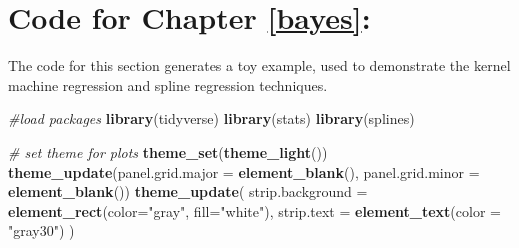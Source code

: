 \documentclass[12pt, twoside]{amherstthesis}
\newenvironment{Shaded}{\begin{snugshade}}{\end{snugshade}}
\newcommand{\AttributeTok}[1]{\textcolor[rgb]{0.13,0.29,0.53}{#1}}
\newcommand{\CommentTok}[1]{\textcolor[rgb]{0.56,0.35,0.01}{\textit{#1}}}
\newcommand{\FunctionTok}[1]{\textcolor[rgb]{0.13,0.29,0.53}{\textbf{#1}}}
\newcommand{\NormalTok}[1]{#1}
\newcommand{\StringTok}[1]{\textcolor[rgb]{0.31,0.60,0.02}{#1}}
\begin{document}
\hypertarget{code-for-chapter-refbayes}{%
\section{Code for Chapter \ref{bayes}:}\label{code-for-chapter-refbayes}}

The code for this section generates a toy example, used to demonstrate the kernel machine regression and spline regression techniques.

\scriptsize
\begin{Shaded}
\begin{Highlighting}[]
\CommentTok{\#load packages}
\FunctionTok{library}\NormalTok{(tidyverse)}
\FunctionTok{library}\NormalTok{(stats)}
\FunctionTok{library}\NormalTok{(splines)}
\end{Highlighting}
\end{Shaded}
\normalsize

\scriptsize
\begin{Shaded}
\begin{Highlighting}[]
\CommentTok{\# set theme for plots}
\FunctionTok{theme\_set}\NormalTok{(}\FunctionTok{theme\_light}\NormalTok{())}
\FunctionTok{theme\_update}\NormalTok{(}\AttributeTok{panel.grid.major =} \FunctionTok{element\_blank}\NormalTok{(), }
             \AttributeTok{panel.grid.minor =} \FunctionTok{element\_blank}\NormalTok{())}
\FunctionTok{theme\_update}\NormalTok{(}
  \AttributeTok{strip.background =} \FunctionTok{element\_rect}\NormalTok{(}\AttributeTok{color=}\StringTok{"gray"}\NormalTok{, }\AttributeTok{fill=}\StringTok{"white"}\NormalTok{), }
  \AttributeTok{strip.text =} \FunctionTok{element\_text}\NormalTok{(}\AttributeTok{color =} \StringTok{"gray30"}\NormalTok{)}
\NormalTok{  )}
\end{Highlighting}
\end{Shaded}
\normalsize
\end{document}

